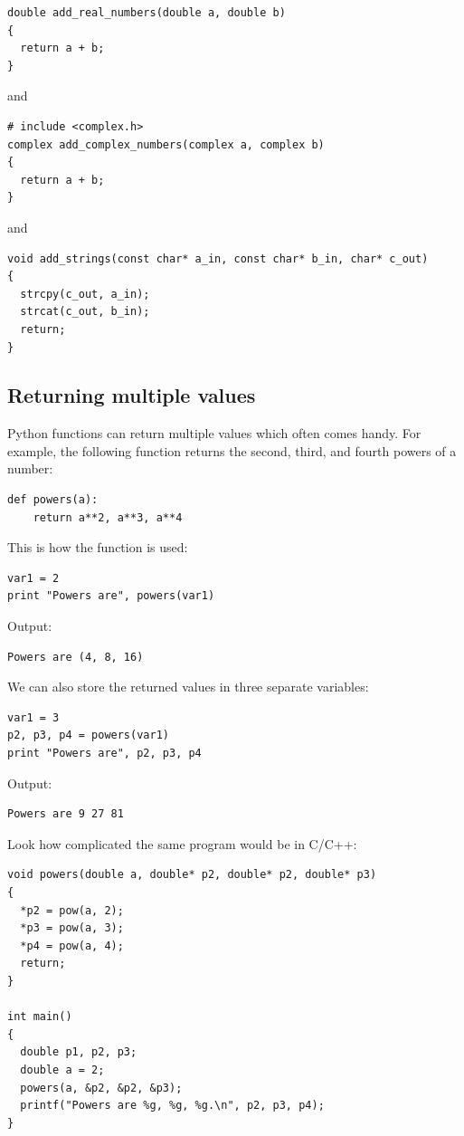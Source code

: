 \begin{verbatim}
double add_real_numbers(double a, double b)
{
  return a + b;
}
\end{verbatim}
and

\begin{verbatim}
# include <complex.h>
complex add_complex_numbers(complex a, complex b)
{
  return a + b;
}
\end{verbatim}
and 

\begin{verbatim}
void add_strings(const char* a_in, const char* b_in, char* c_out)
{
  strcpy(c_out, a_in);
  strcat(c_out, b_in);
  return;
}
\end{verbatim}

\subsection{Returning multiple values}

Python functions can return multiple values which often comes handy.
For example, the following function returns the 
second, third, and fourth powers of a number:

\begin{verbatim}
def powers(a):
    return a**2, a**3, a**4
\end{verbatim}
This is how the function is used:

\begin{verbatim}
var1 = 2
print "Powers are", powers(var1)
\end{verbatim}
Output:

\begin{verbatim}
Powers are (4, 8, 16)
\end{verbatim}
We can also store the returned values in three separate variables:

\begin{verbatim}
var1 = 3
p2, p3, p4 = powers(var1)
print "Powers are", p2, p3, p4
\end{verbatim}
Output:

\begin{verbatim}
Powers are 9 27 81
\end{verbatim}
Look how complicated the same program would be in C/C++:

\begin{verbatim}
void powers(double a, double* p2, double* p2, double* p3)
{
  *p2 = pow(a, 2);
  *p3 = pow(a, 3);
  *p4 = pow(a, 4);
  return;
}

int main()
{
  double p1, p2, p3;
  double a = 2;
  powers(a, &p2, &p2, &p3);
  printf("Powers are %g, %g, %g.\n", p2, p3, p4);
}
\end{verbatim}


